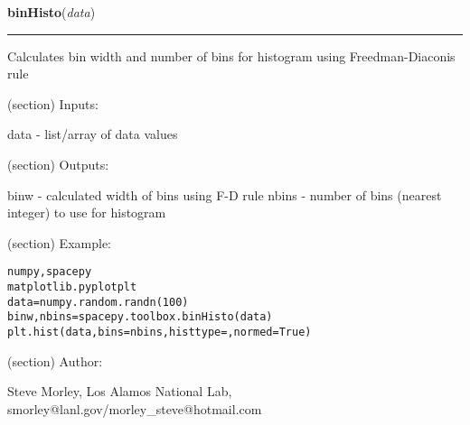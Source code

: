 \hspace{.8\funcindent}\begin{boxedminipage}{\funcwidth}

    \raggedright \textbf{binHisto}(\textit{data})

    \vspace{-1.5ex}

    \rule{\textwidth}{0.5\fboxrule}
\setlength{\parskip}{2ex}
    Calculates bin width and number of bins for histogram using 
    Freedman-Diaconis rule

    (section) Inputs:

      data - list/array of data values

    (section) Outputs:

      binw - calculated width of bins using F-D rule nbins - number of bins
      (nearest integer) to use for histogram

    (section) Example:

\begin{alltt}
\pysrcprompt{{\textgreater}{\textgreater}{\textgreater} } numpy, spacepy
\pysrcprompt{{\textgreater}{\textgreater}{\textgreater} } matplotlib.pyplot  plt
\pysrcprompt{{\textgreater}{\textgreater}{\textgreater} }data = numpy.random.randn(100)
\pysrcprompt{{\textgreater}{\textgreater}{\textgreater} }binw, nbins = spacepy.toolbox.binHisto(data)
\pysrcprompt{{\textgreater}{\textgreater}{\textgreater} }plt.hist(data, bins=nbins, histtype=, normed=True)\end{alltt}
    (section) Author:

      Steve Morley, Los Alamos National Lab, 
      smorley@lanl.gov/morley\_steve@hotmail.com

\setlength{\parskip}{1ex}
    \end{boxedminipage}

    \label{spacepy:toolbox:smartTimeTicks}

    \vspace{0.5ex}


